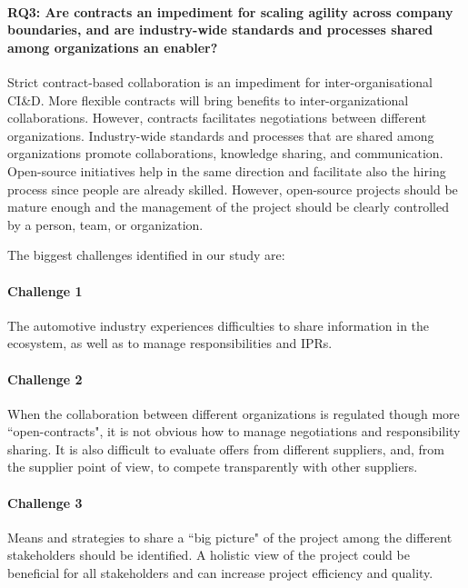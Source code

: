 \paragraph*{RQ3: Are contracts an impediment for scaling agility across company boundaries, and 
are industry-wide standards and processes shared among organizations an enabler?}  Strict contract-based collaboration is an impediment for inter-organisational CI\&D. More flexible contracts will bring benefits to inter-organizational collaborations. However, contracts facilitates negotiations between different organizations. Industry-wide standards and processes that are shared among organizations promote collaborations, knowledge sharing, and communication. Open-source initiatives help in the same direction and facilitate also the hiring process since people are already skilled. However, open-source projects should be mature enough and the management of the project should be clearly controlled by a person, team, or organization.


The biggest challenges identified in our study are: 

\paragraph{Challenge 1} The automotive industry experiences difficulties to share information in the ecosystem, as well as to manage responsibilities and IPRs. 
\paragraph{Challenge 2} When the collaboration between different organizations is regulated though more ``open-contracts", it is not obvious  how to manage negotiations and responsibility sharing. It is also difficult to evaluate offers from different suppliers, and, from the supplier point of view, to compete transparently with other suppliers. 
\paragraph{Challenge 3} Means and strategies to share a ``big picture" of the project among the different stakeholders should be identified. A holistic view of the project could be beneficial for all stakeholders and can increase project efficiency and quality. 





